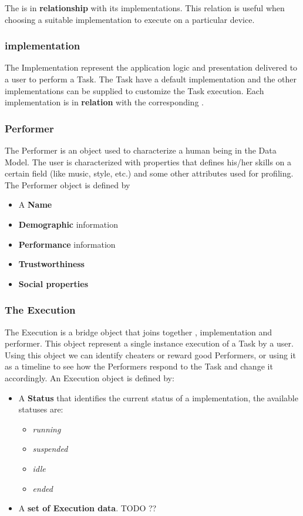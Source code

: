 The \utask{} is in \textbf{relationship} with its \utask{} implementations. This
relation is useful when choosing a suitable implementation to execute on a
particular device.



\subsubsection{\utask{} implementation}
The \utask{} Implementation represent the application logic and presentation
delivered to a user to perform a Task. The Task have a default implementation
and the other implementations can be supplied to customize the Task execution.
Each \utask{} implementation is in \textbf{relation} with the corresponding
\utask{}.




\subsubsection{Performer}
The Performer is an object used to characterize a human being in the Data Model.
The user is characterized with properties that defines his/her skills on a
certain field (like music, style, etc.) and some other attributes used for
profiling. The Performer object is defined by
\begin{itemize}
    \item A \textbf{Name}
    \item \textbf{Demographic} information
    \item \textbf{Performance} information
    \item \textbf{Trustworthiness}
    \item \textbf{Social properties}
\end{itemize}



\subsubsection{The Execution}
The Execution is a bridge object that joins together \utask{}, \utask{}
implementation and performer. This object represent a single instance execution
of a Task by a user. Using this object we can identify cheaters or reward good
Performers, or using it as a timeline to see how the Performers respond to
the Task and change it accordingly. An Execution object is defined by:
\begin{itemize}
    \item A \textbf{Status} that identifies the current status of a \utask{}
    implementation, the available statuses are:
    \begin{itemize}
        \item \emph{running}
        \item \emph{suspended}
        \item \emph{idle}
        \item \emph{ended}
    \end{itemize}

    \item A \textbf{set of Execution data}. TODO ??
\end{itemize}

